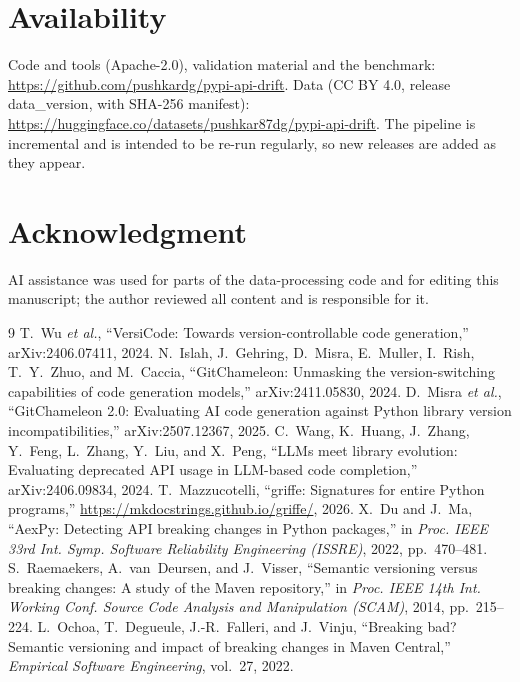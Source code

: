 \documentclass[10pt,twocolumn,letterpaper]{article}
\begin{document}
\section{Availability}
Code and tools (Apache-2.0), validation material and the benchmark:
\url{https://github.com/pushkardg/pypi-api-drift}. Data (CC BY 4.0, release {{data_version}}, with SHA-256 manifest):
\url{https://huggingface.co/datasets/pushkar87dg/pypi-api-drift}. The pipeline is incremental and is intended to be
re-run regularly, so new releases are added as they appear.

\section*{Acknowledgment}
AI assistance was used for parts of the data-processing code and for editing this manuscript; the author reviewed
all content and is responsible for it.

\balance
\begin{thebibliography}{9}\footnotesize
{} T.~Wu \emph{et al.}, ``VersiCode: Towards version-controllable code generation,'' arXiv:2406.07411, 2024.
 N.~Islah, J.~Gehring, D.~Misra, E.~Muller, I.~Rish, T.~Y.~Zhuo, and M.~Caccia, ``GitChameleon: Unmasking the version-switching capabilities of code generation models,'' arXiv:2411.05830, 2024.
 D.~Misra \emph{et al.}, ``GitChameleon 2.0: Evaluating AI code generation against Python library version incompatibilities,'' arXiv:2507.12367, 2025.
 C.~Wang, K.~Huang, J.~Zhang, Y.~Feng, L.~Zhang, Y.~Liu, and X.~Peng, ``LLMs meet library evolution: Evaluating deprecated API usage in LLM-based code completion,'' arXiv:2406.09834, 2024.
 T.~Mazzucotelli, ``griffe: Signatures for entire Python programs,'' \url{https://mkdocstrings.github.io/griffe/}, 2026.
 X.~Du and J.~Ma, ``AexPy: Detecting API breaking changes in Python packages,'' in \emph{Proc. IEEE 33rd Int. Symp. Software Reliability Engineering (ISSRE)}, 2022, pp.~470--481.
 S.~Raemaekers, A.~van~Deursen, and J.~Visser, ``Semantic versioning versus breaking changes: A study of the Maven repository,'' in \emph{Proc. IEEE 14th Int. Working Conf. Source Code Analysis and Manipulation (SCAM)}, 2014, pp.~215--224.
 L.~Ochoa, T.~Degueule, J.-R.~Falleri, and J.~Vinju, ``Breaking bad? Semantic versioning and impact of breaking changes in Maven Central,'' \emph{Empirical Software Engineering}, vol.~27, 2022.
\end{thebibliography}
\end{document}
